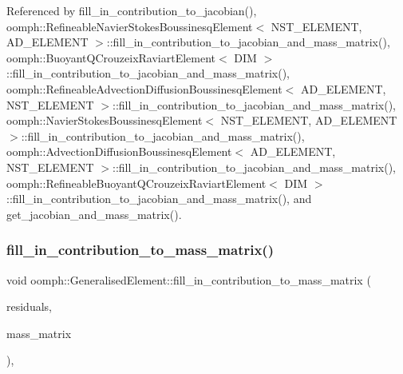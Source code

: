 Referenced by fill\+\_\+in\+\_\+contribution\+\_\+to\+\_\+jacobian(), oomph\+::\+Refineable\+Navier\+Stokes\+Boussinesq\+Element$<$ N\+S\+T\+\_\+\+E\+L\+E\+M\+E\+N\+T, A\+D\+\_\+\+E\+L\+E\+M\+E\+N\+T $>$\+::fill\+\_\+in\+\_\+contribution\+\_\+to\+\_\+jacobian\+\_\+and\+\_\+mass\+\_\+matrix(), oomph\+::\+Buoyant\+Q\+Crouzeix\+Raviart\+Element$<$ D\+I\+M $>$\+::fill\+\_\+in\+\_\+contribution\+\_\+to\+\_\+jacobian\+\_\+and\+\_\+mass\+\_\+matrix(), oomph\+::\+Refineable\+Advection\+Diffusion\+Boussinesq\+Element$<$ A\+D\+\_\+\+E\+L\+E\+M\+E\+N\+T, N\+S\+T\+\_\+\+E\+L\+E\+M\+E\+N\+T $>$\+::fill\+\_\+in\+\_\+contribution\+\_\+to\+\_\+jacobian\+\_\+and\+\_\+mass\+\_\+matrix(), oomph\+::\+Navier\+Stokes\+Boussinesq\+Element$<$ N\+S\+T\+\_\+\+E\+L\+E\+M\+E\+N\+T, A\+D\+\_\+\+E\+L\+E\+M\+E\+N\+T $>$\+::fill\+\_\+in\+\_\+contribution\+\_\+to\+\_\+jacobian\+\_\+and\+\_\+mass\+\_\+matrix(), oomph\+::\+Advection\+Diffusion\+Boussinesq\+Element$<$ A\+D\+\_\+\+E\+L\+E\+M\+E\+N\+T, N\+S\+T\+\_\+\+E\+L\+E\+M\+E\+N\+T $>$\+::fill\+\_\+in\+\_\+contribution\+\_\+to\+\_\+jacobian\+\_\+and\+\_\+mass\+\_\+matrix(), oomph\+::\+Refineable\+Buoyant\+Q\+Crouzeix\+Raviart\+Element$<$ D\+I\+M $>$\+::fill\+\_\+in\+\_\+contribution\+\_\+to\+\_\+jacobian\+\_\+and\+\_\+mass\+\_\+matrix(), and get\+\_\+jacobian\+\_\+and\+\_\+mass\+\_\+matrix().

\mbox{\label{classoomph_1_1GeneralisedElement_a09e337880e9bfc6e2d43202616121b50}} 
\subsubsection{\texorpdfstring{fill\+\_\+in\+\_\+contribution\+\_\+to\+\_\+mass\+\_\+matrix()}{fill\_in\_contribution\_to\_mass\_matrix()}}
{\footnotesize\ttfamily void oomph\+::\+Generalised\+Element\+::fill\+\_\+in\+\_\+contribution\+\_\+to\+\_\+mass\+\_\+matrix (\begin{DoxyParamCaption}\item[{\hyperlink{classoomph_1_1Vector}{Vector}$<$ double $>$ \&}]{residuals,  }\item[{\hyperlink{classoomph_1_1DenseMatrix}{Dense\+Matrix}$<$ double $>$ \&}]{mass\+\_\+matrix }\end{DoxyParamCaption})\hspace{0.3cm}{\ttfamily [protected]}, {\ttfamily [virtual]}}



